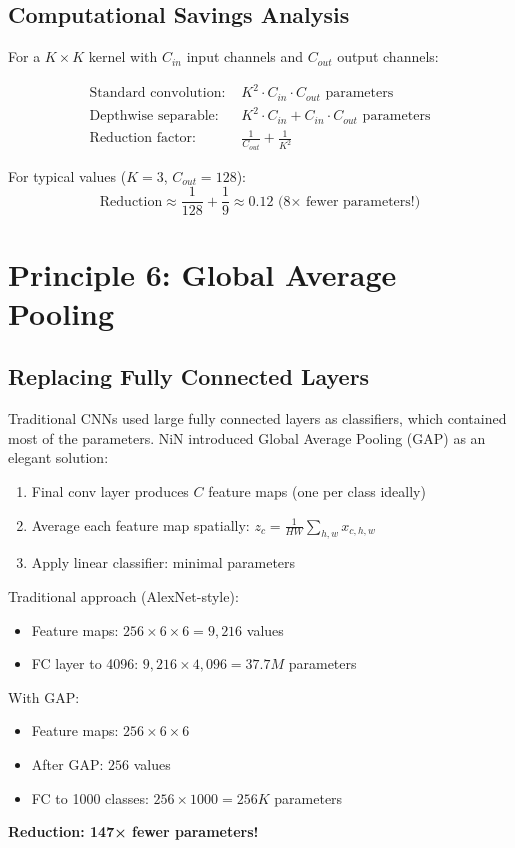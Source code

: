 \documentclass{article}
\begin{document}
\subsection{Computational Savings Analysis}

For a $K \times K$ kernel with $C_{in}$ input channels and $C_{out}$ output channels:

\begin{align}
\text{Standard convolution: } & K^2 \cdot C_{in} \cdot C_{out} \text{ parameters} \\
\text{Depthwise separable: } & K^2 \cdot C_{in} + C_{in} \cdot C_{out} \text{ parameters} \\
\text{Reduction factor: } & \frac{1}{C_{out}} + \frac{1}{K^2}
\end{align}

For typical values ($K=3$, $C_{out}=128$):
$$\text{Reduction} \approx \frac{1}{128} + \frac{1}{9} \approx 0.12 \text{ (8× fewer parameters!)}$$

\section{Principle 6: Global Average Pooling}

\subsection{Replacing Fully Connected Layers}

Traditional CNNs used large fully connected layers as classifiers, which contained most of the parameters. NiN introduced Global Average Pooling (GAP) as an elegant solution:

\begin{enumerate}
    \item Final conv layer produces $C$ feature maps (one per class ideally)
    \item Average each feature map spatially: $z_c = \frac{1}{HW}\sum_{h,w} x_{c,h,w}$
    \item Apply linear classifier: minimal parameters
\end{enumerate}

\begin{tcolorbox}[colback=blue!5!white, colframe=blue!50!black, title=Parameter Reduction Example]
Traditional approach (AlexNet-style):
\begin{itemize}
    \item Feature maps: $256 \times 6 \times 6 = 9,216$ values
    \item FC layer to 4096: $9,216 \times 4,096 = 37.7M$ parameters
\end{itemize}

With GAP:
\begin{itemize}
    \item Feature maps: $256 \times 6 \times 6$
    \item After GAP: $256$ values
    \item FC to 1000 classes: $256 \times 1000 = 256K$ parameters
\end{itemize}

\textbf{Reduction: 147× fewer parameters!}
\end{tcolorbox}
\end{document}
